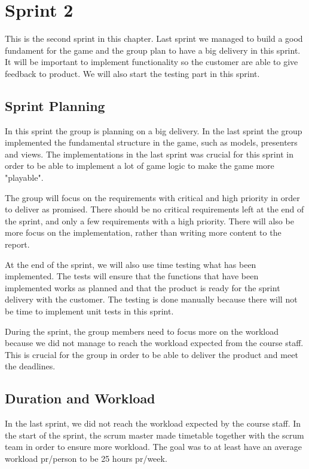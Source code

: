 
\section{Sprint 2}

	This is the second sprint in this chapter. Last sprint we managed to build a good
	fundament for the game and the group plan to have a big delivery in this sprint.
	It will be important to implement functionality so the customer are able to 
	give feedback to product. We will also start the testing part in this sprint.

\subsection{Sprint Planning}
	In this sprint the group is planning on a big delivery. In the last sprint the group
	implemented the fundamental structure in the game, such as models, presenters and views. 
	The implementations in the last sprint was crucial for this sprint in order to 
	be able to implement a lot of game logic to make the game more "playable".

	The group will focus on the requirements with critical and high priority in order
	to deliver as promised. There should be no critical requirements left at the end of 
	the sprint, and only a few requirements with a high priority. There will also be more 
	focus on the implementation, rather than writing more content to the report.

	At the end of the sprint, we will also use time testing what has been implemented.
	The tests will ensure that the functions that have been implemented works as planned 
	and that the product is ready for the sprint delivery with the customer. The testing is 
	done manually because there will not be time to implement unit tests in this sprint.

	During the sprint, the group members need to focus more on the workload because we did
	not manage to reach the workload expected from the course staff. This is crucial
	for the group in order to be able to deliver the product and meet the deadlines.

\subsection{Duration and Workload}
	In the last sprint, we did not reach the workload expected by the course staff.
	In the start of the sprint, the scrum master made timetable together with the
	scrum team in order to ensure more workload. The goal was to at least have an
	average workload pr/person to be 25 hours pr/week. 

